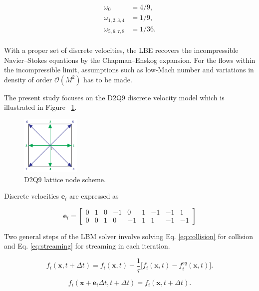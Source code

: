 \begin{align}
	\label{weights}
	\omega_0 &= 4/9,\\
	\omega_{1,2,3,4} &= 1/9,\\
	\omega_{5,6,7,8} &= 1/36.\\
\end{align}

With a proper set of discrete velocities, the LBE recovers the incompressible Navier–Stokes equations by the Chapman–Enskog expansion. For the flows within the incompressible limit, assumptions such as low-Mach number and variations in density of order $\mathcal{O}(M^2)$ has to be made.

The present study focuses on the D2Q9 discrete velocity model which is illustrated in Figure~ \ref{fig:d2q9-node}. 

\begin{figure}[!ht]
	\centering
	\captionsetup{justification=centering}
	\includegraphics[width=0.25\textwidth]{figures/D2Q9_colored.pdf}
	\caption{D2Q9 lattice node scheme.}
	\label{fig:d2q9-node}
\end{figure}

Discrete velocities $\bm{e}_i$ are expressed as

\begin{equation}
	\label{discrete-velocities}
	\bm{e}_i = \begin{bmatrix}
		0 & 1 & 0 &-1 & 0 & 1 &-1 &-1 & 1\\
		0 & 0 & 1 & 0 &-1 & 1 & 1 &-1 &-1
	\end{bmatrix}
\end{equation}

Two general steps of the LBM solver involve solving  Eq. \ref{eq:collision} for collision and Eq. \ref{eq:streaming} for streaming in each iteration.

\begin{equation}
	\label{eq:collision}
	f_i (\bm{x},t+\Delta t) = f_i (\bm{x},t)-\frac{1}{\tau}\Big[f_i (\bm{x},t) - f_i^{eq} (\bm{x},t)\Big].
\end{equation}

\begin{equation}
	\label{eq:streaming}
	f_i (\bm{x}+\bm{e}_i\Delta t,t+\Delta t) = f_i (\bm{x},t+\Delta t).
\end{equation}

